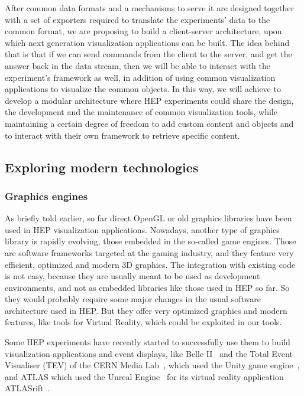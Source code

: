 \documentclass[12pt,a4paper]{article}
\begin{document}
After common data formats and a mechanisms to serve it are designed together with a set of exporters required to translate the
experiments’ data to the common format, we are proposing to build a client-server architecture, upon which next generation visualization applications can be built.
The idea behind that is that if we can send commands from the client to the server, and get the answer back in the data stream,
then we will be able to interact with the experiment’s framework as well, in addition of using common visualization applications
to visualize the common objects. In this way, we will achieve to develop a modular architecture where HEP experiments could share
the design, the development and the maintenance of common visualization tools, while maintaining a certain degree of freedom to
add custom content and objects and to interact with their own framework to retrieve specific content.

\hypertarget{modern-tech}{%
\subsection{Exploring modern technologies}\label{modern-tech}}

\hypertarget{graphic-engines}{%
\subsubsection{Graphics engines}\label{graphic-engines}}

As briefly told earlier, so far direct OpenGL or old graphics libraries have been used in HEP visualization applications. Nowadays,
another type of graphics library is rapidly evolving, those embedded in the so-called game engines. Those are software frameworks
targeted at the gaming industry, and they feature very efficient, optimized and modern 3D graphics.
The integration with existing code is not easy, because they are usually meant to be used as development environments, and not as
embedded libraries like those used in HEP so far. So they would probably require some major changes in the usual software architecture
used in HEP. But they offer very optimized graphics and modern features, like tools for Virtual Reality, which could be exploited in our tools.

Some HEP experiments have recently started to successfully use them to build visualization applications and event displays,
like Belle II~\cite{BelleIIVR} and the Total Event Visualiser (TEV) of the CERN Media Lab~\cite{CERNTEV}, which used the Unity
game engine~\cite{Unity3D}, and ATLAS which used the Unreal Engine~\cite{EpicUnreal} for its virtual reality application
ATLASrift~\cite{ATLASRift}.
\end{document}

